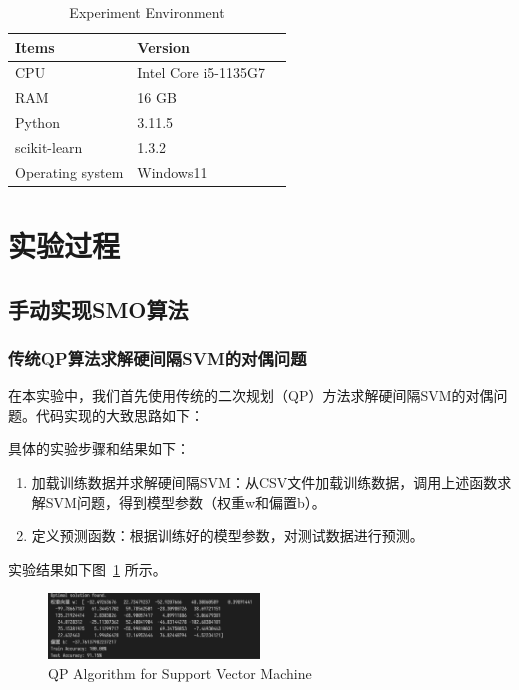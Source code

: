 \documentclass[12pt]{article}
\begin{document}
\begin{table}[!t]
  \caption{Experiment Environment}
  \label{tab:indicators}
  \centering
  \begin{tabular}{m{5cm}<{\centering}m{5cm}<{\centering}m{4cm}<{\centering}}
    \toprule
    \textbf{Items}   & \textbf{Version}     \\[\medskipamount]
    \midrule
    CPU              & Intel Core i5-1135G7 \\[\medskipamount]
    RAM              & 16 GB                \\[\medskipamount]
    Python           & 3.11.5               \\[\medskipamount]
    scikit-learn     & 1.3.2                \\[\medskipamount]
    Operating system & Windows11            \\[\medskipamount]
    \bottomrule
  \end{tabular}
\end{table}

\section{实验过程}
\subsection{手动实现SMO算法}

\subsubsection{传统QP算法求解硬间隔SVM的对偶问题}
在本实验中，我们首先使用传统的二次规划（QP）方法求解硬间隔SVM的对偶问题。代码实现的大致思路如下：

具体的实验步骤和结果如下：

\begin{enumerate}
  \item 加载训练数据并求解硬间隔SVM：从CSV文件加载训练数据，调用上述函数求解SVM问题，得到模型参数（权重w和偏置b）。
  \item 定义预测函数：根据训练好的模型参数，对测试数据进行预测。
\end{enumerate}

实验结果如下图~\ref{QP Algorithm for Support Vector Machine} 所示。

\begin{figure}[htbp]
  \centering
  \includegraphics[width=0.5\textwidth]{figures/QP_hard_SVM_result.png}
  \caption{QP Algorithm for Support Vector Machine}
  \label{QP Algorithm for Support Vector Machine}
\end{figure}
\end{document}
